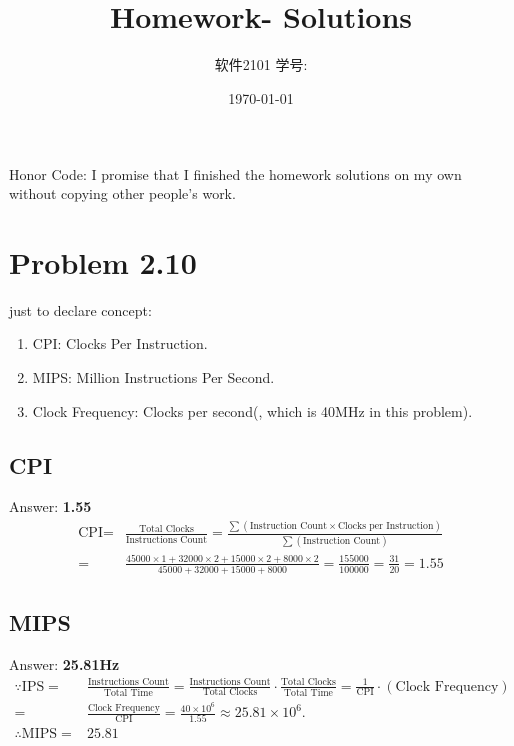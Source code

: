 \documentclass[11pt]{article}  %
\title{\vspace{-4cm}\CourseCodeName \space
        \Session \protect\\  Homework-\textbf{\Homework} Solutions}
\author{软件2101 \Name \space 学号: \SID}
\date{\today}
\begin{document}
\maketitle

Honor Code: I promise that I finished the homework solutions on my own without copying other people's 
    work.

\section*{Problem 2.10}

just to declare concept: 
\begin{enumerate}
    \item CPI: Clocks Per Instruction.
    \item MIPS: Million Instructions Per Second.
    \item Clock Frequency: Clocks per second(, which is 40MHz in this problem).
    \end{enumerate}

\subsection*{CPI}
    Answer: \textbf{1.55} 
    $$
    \begin{aligned}
        \text{CPI} = &\frac{\text{Total Clocks}}{\text{Instructions Count}} = 
            \frac{\sum\left(\text{Instruction Count} \times \text{Clocks per Instruction}\right)}
            {\sum\left(\text{Instruction Count}\right)}\\
        = & \frac{45000\times 1+32000 \times 2+15000\times 2+ 8000\times 2}{45000+32000+15000+8000} = 
            \frac{155000}{100000} = \frac{31}{20} = 1.55
    \end{aligned}
    $$

\subsection*{MIPS}
    Answer: \textbf{25.81Hz}
    $$
    \begin{aligned}
        \because \text{IPS} =& \frac{\text{Instructions Count}}{\text{Total Time}} = 
            \frac{\text{Instructions Count}}{\text{Total Clocks}}\cdot\frac{\text{Total Clocks}}
            {\text{Total Time}} = \frac{1}{\text{CPI}}\cdot \left(\text{Clock Frequency}\right)\\
        =&\frac{\text{Clock Frequency}}{\text{CPI}} = 
            \frac{40\times 10^6}{1.55} \approx 25.81 \times 10^6. \\
        \therefore \text{MIPS} =& 25.81
    \end{aligned}
    $$
\end{document}

